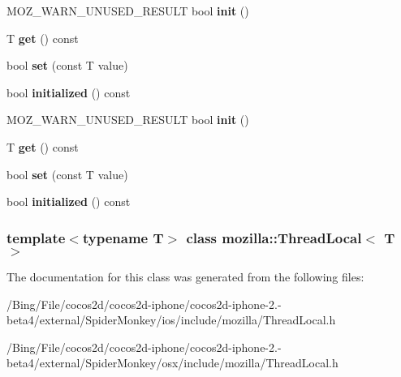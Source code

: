 \begin{DoxyCompactItemize}
\item 
\hypertarget{classmozilla_1_1_thread_local_a88fb2759c4baaa3334e29a798535d41a}{M\-O\-Z\-\_\-\-W\-A\-R\-N\-\_\-\-U\-N\-U\-S\-E\-D\-\_\-\-R\-E\-S\-U\-L\-T bool {\bfseries init} ()}\label{classmozilla_1_1_thread_local_a88fb2759c4baaa3334e29a798535d41a}

\item 
\hypertarget{classmozilla_1_1_thread_local_ab26f55050dcd7d9bdb7637328f26f0ba}{T {\bfseries get} () const }\label{classmozilla_1_1_thread_local_ab26f55050dcd7d9bdb7637328f26f0ba}

\item 
\hypertarget{classmozilla_1_1_thread_local_ab85cd9a423153df936b02b5adc59a898}{bool {\bfseries set} (const T value)}\label{classmozilla_1_1_thread_local_ab85cd9a423153df936b02b5adc59a898}

\item 
\hypertarget{classmozilla_1_1_thread_local_a34cdc4ebb2d540c072f26b8964978bb2}{bool {\bfseries initialized} () const }\label{classmozilla_1_1_thread_local_a34cdc4ebb2d540c072f26b8964978bb2}

\item 
\hypertarget{classmozilla_1_1_thread_local_a6b3fdc9f5f726368ff8e26036004ecdf}{M\-O\-Z\-\_\-\-W\-A\-R\-N\-\_\-\-U\-N\-U\-S\-E\-D\-\_\-\-R\-E\-S\-U\-L\-T bool {\bfseries init} ()}\label{classmozilla_1_1_thread_local_a6b3fdc9f5f726368ff8e26036004ecdf}

\item 
\hypertarget{classmozilla_1_1_thread_local_ab26f55050dcd7d9bdb7637328f26f0ba}{T {\bfseries get} () const }\label{classmozilla_1_1_thread_local_ab26f55050dcd7d9bdb7637328f26f0ba}

\item 
\hypertarget{classmozilla_1_1_thread_local_ab85cd9a423153df936b02b5adc59a898}{bool {\bfseries set} (const T value)}\label{classmozilla_1_1_thread_local_ab85cd9a423153df936b02b5adc59a898}

\item 
\hypertarget{classmozilla_1_1_thread_local_a34cdc4ebb2d540c072f26b8964978bb2}{bool {\bfseries initialized} () const }\label{classmozilla_1_1_thread_local_a34cdc4ebb2d540c072f26b8964978bb2}

\end{DoxyCompactItemize}
\subsubsection*{template$<$typename T$>$ class mozilla\-::\-Thread\-Local$<$ T $>$}



The documentation for this class was generated from the following files\-:\begin{DoxyCompactItemize}
\item 
/\-Bing/\-File/cocos2d/cocos2d-\/iphone/cocos2d-\/iphone-\/2.-\/beta4/external/\-Spider\-Monkey/ios/include/mozilla/Thread\-Local.\-h\item 
/\-Bing/\-File/cocos2d/cocos2d-\/iphone/cocos2d-\/iphone-\/2.-\/beta4/external/\-Spider\-Monkey/osx/include/mozilla/Thread\-Local.\-h\end{DoxyCompactItemize}
